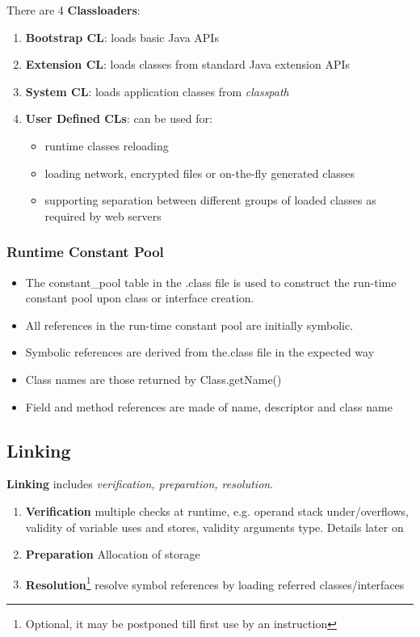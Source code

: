 There are 4 \textbf{Classloaders}:
\begin{enumerate}
    \item \textbf{Bootstrap CL}: loads basic Java APIs
    \item \textbf{Extension CL}: loads classes from standard Java extension APIs
    \item \textbf{System CL}: loads application classes from \textit{classpath} 
    \item \textbf{User Defined CLs}: can be used for:
    \begin{itemize}
        \item runtime classes reloading
        \item loading network, encrypted files or on-the-fly generated classes
        \item supporting separation between different groups of loaded classes as required by web servers
    \end{itemize}
\end{enumerate}

\subsubsection{Runtime Constant Pool}

\begin{itemize}
	\item The constant_pool table in the .class file is
	      used to construct the run-time constant pool
	      upon class or interface creation.
	\item All references in the run-time constant pool are
	      initially symbolic.
	\item Symbolic references are derived from
	      the.class file in the expected way
	\item Class names are those returned by
	      Class.getName()
	\item Field and method references are made of name,
	      descriptor and class name
\end{itemize}

\subsection{Linking}
\textbf{Linking} includes \textit{verification, preparation, resolution}.
\begin{enumerate}
    \item \textbf{Verification} multiple checks at runtime, e.g. operand stack under/overflows, validity of variable uses and stores, validity arguments type.
    Details later on
    \item \textbf{Preparation} Allocation of storage 
    \item \textbf{Resolution}\footnote{Optional, it may be postponed till first use by an instruction} resolve symbol references by loading referred classes/interfaces
\end{enumerate}

